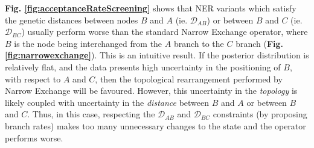 \documentclass[10pt,letterpaper]{article}
\begin{document}
\textbf{Fig. \ref{fig:acceptanceRateScreening}} shows that NER variants which satisfy the genetic distances between nodes $B$ and $A$ (ie. $\mathcal{D}_{AB}$) or between $B$ and $C$ (ie. $\mathcal{D}_{BC}$) usually perform worse than the standard Narrow Exchange operator, where $B$ is the node being interchanged from the $A$ branch to the $C$ branch (\textbf{Fig. \ref{fig:narrowexchange}}). This is an intuitive result. If the posterior distribution is relatively flat, and the data presents high uncertainty in the positioning of $B$, with respect to $A$ and $C$, then the topological rearrangement performed by Narrow Exchange will be favoured. However, this uncertainty in the \textit{topology} is likely coupled with uncertainty in the \textit{distance} between $B$ and $A$ or between $B$ and $C$. Thus, in this case, respecting the $\mathcal{D}_{AB}$ and $\mathcal{D}_{BC}$ constraints (by proposing branch rates) makes too many unnecessary changes to the state and the operator performs worse.
\end{document}

